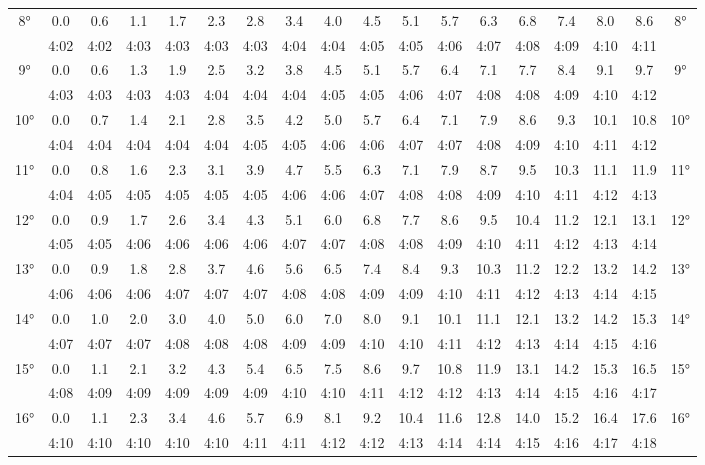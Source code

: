 \begin{footnotesize}
\begin{tabular}{c || c | c | c | c | c | c | c | c | c | c | c | c | c | c | c | c || c}
		\multirow{2}{*}{8°}&0.0&0.6&1.1&1.7&2.3&2.8&3.4&4.0&4.5&5.1&5.7&6.3&6.8&7.4&8.0&8.6&\multirow{2}{*}{8°}\\ \space&4:02&4:02&4:03&4:03&4:03&4:03&4:04&4:04&4:05&4:05&4:06&4:07&4:08&4:09&4:10&4:11&\space\\\hline
		\multirow{2}{*}{9°}&0.0&0.6&1.3&1.9&2.5&3.2&3.8&4.5&5.1&5.7&6.4&7.1&7.7&8.4&9.1&9.7&\multirow{2}{*}{9°}\\ \space&4:03&4:03&4:03&4:03&4:04&4:04&4:04&4:05&4:05&4:06&4:07&4:08&4:08&4:09&4:10&4:12&\space\\\hline
		\multirow{2}{*}{10°}&0.0&0.7&1.4&2.1&2.8&3.5&4.2&5.0&5.7&6.4&7.1&7.9&8.6&9.3&10.1&10.8&\multirow{2}{*}{10°}\\ \space&4:04&4:04&4:04&4:04&4:04&4:05&4:05&4:06&4:06&4:07&4:07&4:08&4:09&4:10&4:11&4:12&\space\\\hline
		\multirow{2}{*}{11°}&0.0&0.8&1.6&2.3&3.1&3.9&4.7&5.5&6.3&7.1&7.9&8.7&9.5&10.3&11.1&11.9&\multirow{2}{*}{11°}\\ \space&4:04&4:05&4:05&4:05&4:05&4:05&4:06&4:06&4:07&4:08&4:08&4:09&4:10&4:11&4:12&4:13&\space\\\hline
		\multirow{2}{*}{12°}&0.0&0.9&1.7&2.6&3.4&4.3&5.1&6.0&6.8&7.7&8.6&9.5&10.4&11.2&12.1&13.1&\multirow{2}{*}{12°}\\ \space&4:05&4:05&4:06&4:06&4:06&4:06&4:07&4:07&4:08&4:08&4:09&4:10&4:11&4:12&4:13&4:14&\space\\\hline
		\multirow{2}{*}{13°}&0.0&0.9&1.8&2.8&3.7&4.6&5.6&6.5&7.4&8.4&9.3&10.3&11.2&12.2&13.2&14.2&\multirow{2}{*}{13°}\\ \space&4:06&4:06&4:06&4:07&4:07&4:07&4:08&4:08&4:09&4:09&4:10&4:11&4:12&4:13&4:14&4:15&\space\\\hline
		\multirow{2}{*}{14°}&0.0&1.0&2.0&3.0&4.0&5.0&6.0&7.0&8.0&9.1&10.1&11.1&12.1&13.2&14.2&15.3&\multirow{2}{*}{14°}\\ \space&4:07&4:07&4:07&4:08&4:08&4:08&4:09&4:09&4:10&4:10&4:11&4:12&4:13&4:14&4:15&4:16&\space\\\hline
		\multirow{2}{*}{15°}&0.0&1.1&2.1&3.2&4.3&5.4&6.5&7.5&8.6&9.7&10.8&11.9&13.1&14.2&15.3&16.5&\multirow{2}{*}{15°}\\ \space&4:08&4:09&4:09&4:09&4:09&4:09&4:10&4:10&4:11&4:12&4:12&4:13&4:14&4:15&4:16&4:17&\space\\\hline
		\multirow{2}{*}{16°}&0.0&1.1&2.3&3.4&4.6&5.7&6.9&8.1&9.2&10.4&11.6&12.8&14.0&15.2&16.4&17.6&\multirow{2}{*}{16°}\\ \space&4:10&4:10&4:10&4:10&4:10&4:11&4:11&4:12&4:12&4:13&4:14&4:14&4:15&4:16&4:17&4:18&\space\\\hline

\end{tabular}
\end{footnotesize}
